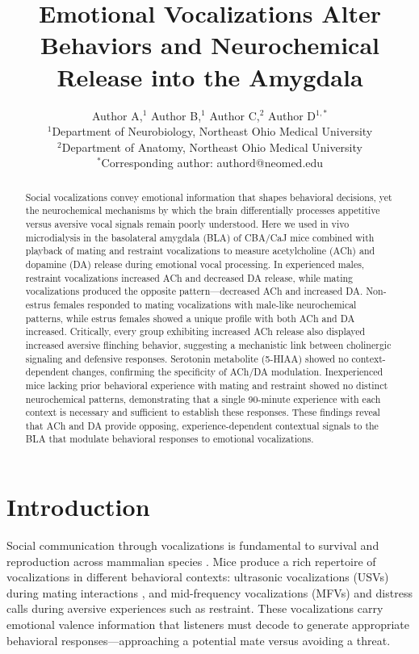 \documentclass[11pt]{article}
\title{Emotional Vocalizations Alter Behaviors and Neurochemical Release into the Amygdala}
\author{Author A,$^{1}$ Author B,$^{1}$ Author C,$^{2}$ Author D$^{1,*}$\\
\small $^{1}$Department of Neurobiology, Northeast Ohio Medical University\\
\small $^{2}$Department of Anatomy, Northeast Ohio Medical University\\
\small $^{*}$Corresponding author: authord@neomed.edu}
\date{}
\begin{document}
\maketitle

\begin{abstract}
Social vocalizations convey emotional information that shapes behavioral decisions, yet the neurochemical mechanisms by which the brain differentially processes appetitive versus aversive vocal signals remain poorly understood. Here we used in vivo microdialysis in the basolateral amygdala (BLA) of CBA/CaJ mice combined with playback of mating and restraint vocalizations to measure acetylcholine (ACh) and dopamine (DA) release during emotional vocal processing. In experienced males, restraint vocalizations increased ACh and decreased DA release, while mating vocalizations produced the opposite pattern---decreased ACh and increased DA. Non-estrus females responded to mating vocalizations with male-like neurochemical patterns, while estrus females showed a unique profile with both ACh and DA increased. Critically, every group exhibiting increased ACh release also displayed increased aversive flinching behavior, suggesting a mechanistic link between cholinergic signaling and defensive responses. Serotonin metabolite (5-HIAA) showed no context-dependent changes, confirming the specificity of ACh/DA modulation. Inexperienced mice lacking prior behavioral experience with mating and restraint showed no distinct neurochemical patterns, demonstrating that a single 90-minute experience with each context is necessary and sufficient to establish these responses. These findings reveal that ACh and DA provide opposing, experience-dependent contextual signals to the BLA that modulate behavioral responses to emotional vocalizations.
\end{abstract}

\section{Introduction}

Social communication through vocalizations is fundamental to survival and reproduction across mammalian species \citep{portfors2007types}. Mice produce a rich repertoire of vocalizations in different behavioral contexts: ultrasonic vocalizations (USVs) during mating interactions \citep{holy2005ultrasonic}, and mid-frequency vocalizations (MFVs) and distress calls during aversive experiences such as restraint. These vocalizations carry emotional valence information that listeners must decode to generate appropriate behavioral responses---approaching a potential mate versus avoiding a threat.
\end{document}
